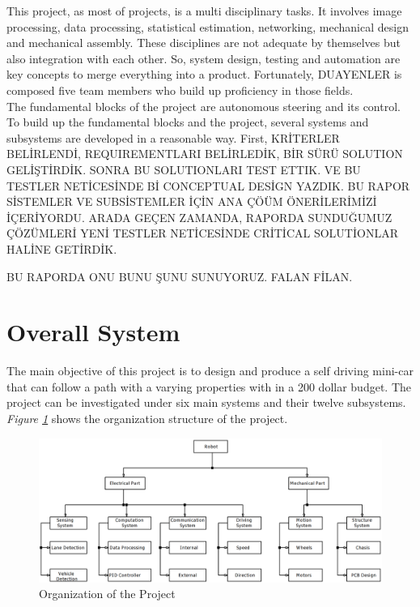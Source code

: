 \documentclass[a4paper,12pt]{article}
\begin{document}
	This project, as most of projects, is a multi disciplinary tasks. It involves image processing, data processing, statistical estimation, networking, mechanical design and mechanical assembly. These disciplines are not adequate by themselves but also integration with each other. So, system design, testing and automation are key concepts to merge everything into a product. Fortunately, DUAYENLER is composed five team members who build up proficiency in those fields.\\
	
	The fundamental blocks of the project are autonomous steering and its control. To build up the fundamental blocks and the project, several systems and subsystems are developed in a reasonable way. First, KRİTERLER BELİRLENDİ, REQUIREMENTLARI BELİRLEDİK, BİR SÜRÜ SOLUTION GELİŞTİRDİK. SONRA BU SOLUTIONLARI  TEST ETTIK. VE BU TESTLER NETİCESİNDE Bİ CONCEPTUAL DESİGN YAZDIK. BU RAPOR SİSTEMLER VE SUBSİSTEMLER İÇİN ANA ÇÖÜM ÖNERİLERİMİZİ İÇERİYORDU. ARADA GEÇEN ZAMANDA, RAPORDA SUNDUĞUMUZ ÇÖZÜMLERİ YENİ TESTLER NETİCESİNDE CRİTİCAL SOLUTİONLAR HALİNE GETİRDİK.
	
	BU RAPORDA ONU BUNU ŞUNU SUNUYORUZ. FALAN FİLAN.
	
	
	
	\newpage
	
		\section{Overall System} 
	
			The main objective of this project is to design and produce a self driving mini-car that can follow a path with a varying properties with in a 200 dollar budget. The project can be investigated under six main systems and their twelve subsystems. \textit{Figure \ref{fig:organization}} shows the organization structure of the project.

	
	
	

	\begin{figure}[h]
		\includegraphics[width=\textwidth,center]{images/system}
		\caption{Organization of the Project}\label{fig:organization}
	\end{figure}
	
\end{document}
